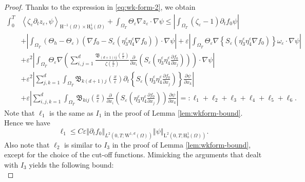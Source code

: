 \documentclass[preprint, 12pt]{amsart}
\numberwithin{equation}{section}
\numberwithin{equation}{section}
\newcommand{\xeps}{\left(\frac{x}{\varepsilon}\right)}
\newcommand{\eps}{\varepsilon}
\begin{document}
\begin{proof}
Thanks to the expression in \eqref{eq:wk-form-2}, we obtain 
\begin{equation*}
\begin{aligned}
\int_0^T & \left\langle \zeta_\eps\partial_{t}z_{\varepsilon},\psi \right\rangle_{\mathrm{H}^{-1}(\Omega) \times \mathrm{H}_0^1(\Omega)} 
+ \int_{\Omega_T} \Theta_\eps\nabla z_{\varepsilon} \cdot \nabla \psi
\le \left\vert \int_{\Omega_T} (\zeta_\eps -1)\partial_{t}f_{0}\psi \right\vert
\\
& 
+ \left\vert \int_{\Omega_T}\left(\Theta_h - \Theta_\eps\right) \left( \nabla f_0 - S_\eps \left( \eta_3^\eps \eta_4^\eps \nabla f_0 \right) \right) \cdot \nabla \psi \right\vert
+ \eps \left\vert \int_{\Omega_T} \Theta_\eps \nabla \left\{S_\eps \left( \eta_3^\eps \eta_4^\eps \nabla f_0 \right)\right\} \omega_\eps \cdot \nabla \psi \right\vert
\\
& + \eps^2 \left\vert \int_{\Omega_T} \Theta_\eps\nabla \left(\sum_{i,j=1}^d \frac{\mathfrak{B}_{(d+1)ij}\xeps}{\zeta\xeps} \frac{\partial}{\partial x_i} \left(S_\eps \left( \eta_3^\eps \eta_4^\eps \frac{\partial f_0}{\partial x_j}\right)\right)\right) \cdot \nabla \psi \right\vert
\\
& + \eps^2 \left\vert \sum_{j,k=1}^d \int_{\Omega_T} \mathfrak{B}_{k(d+1)j}\xeps \partial_t \left\{S_\eps \left( \eta_3^\eps \eta_4^\eps \frac{\partial f_0}{\partial x_j} \right)\right\} \frac{\partial\psi}{\partial x_k} \right\vert
\\
& + \eps \left\vert \sum_{i,j,k=1}^d \int_{\Omega_T} \mathfrak{B}_{kij}\xeps \frac{\partial}{\partial x_i} \left( S_\eps \left( \eta_3^\eps \eta_4^\eps \frac{\partial f_0}{\partial x_j} \right)\right) \frac{\partial\psi}{\partial x_k} \right\vert =: \ell_1 + \ell_2 + \ell_3 + \ell_4 + \ell_5 + \ell_6.
\end{aligned}
\end{equation*}
Note that $\ell_1$ is the same as $I_1$ in the proof of Lemma \ref{lem:wkform-bound}. Hence we have
\begin{equation}\label{eq:bd-ell-1}
\ell_1 \le C \eps\left\Vert \partial_t f_0 \right\Vert_{L^2(0,T;\mathrm W^{1,d}(\Omega))} \left\Vert \psi\right\Vert_{\mathrm L^2(0,T;\mathrm H^1_0(\Omega))} .
\end{equation}
Also note that $\ell_2$ is similar to $I_3$ in the proof of Lemma \ref{lem:wkform-bound}, except for the choice of the cut-off functions. Mimicking the arguments that dealt with $I_3$ yields the following bound:
\begin{equation}\label{eq:bd-ell-2}

\end{equation}
\end{proof}
\end{document}
